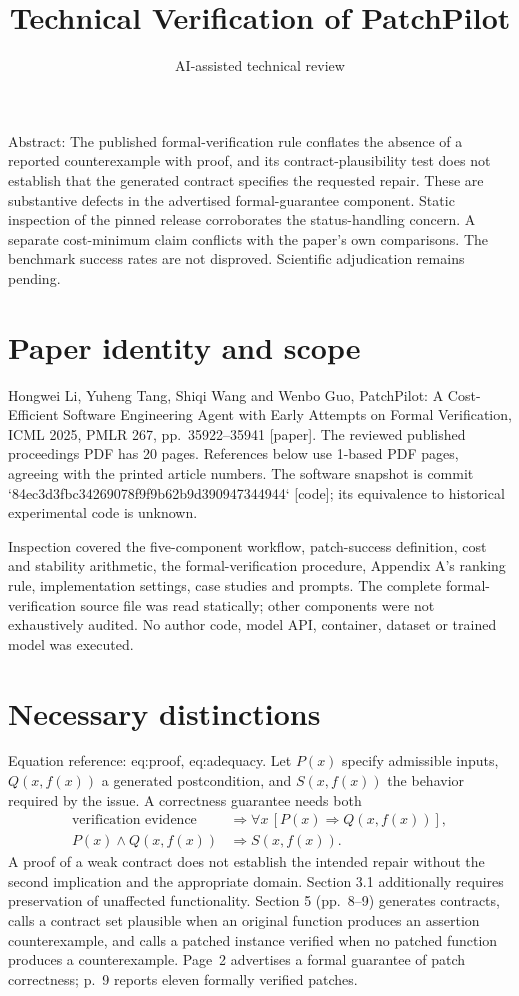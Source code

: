 \documentclass[10pt]{article}
\title{Technical Verification of PatchPilot}
\author{AI-assisted technical review}
\date{}
\begin{document}
\maketitle
Abstract: The published formal-verification rule conflates the absence of a reported counterexample with proof, and its contract-plausibility test does not establish that the generated contract specifies the requested repair. These are substantive defects in the advertised formal-guarantee component. Static inspection of the pinned release corroborates the status-handling concern. A separate cost-minimum claim conflicts with the paper’s own comparisons. The benchmark success rates are not disproved. Scientific adjudication remains pending.\par
\section*{Paper identity and scope}
Hongwei Li, Yuheng Tang, Shiqi Wang and Wenbo Guo, PatchPilot: A Cost-Efficient Software Engineering Agent with Early Attempts on Formal Verification, ICML 2025, PMLR 267, pp. 35922–35941 [paper]. The reviewed published proceedings PDF has 20 pages. References below use 1-based PDF pages, agreeing with the printed article numbers. The software snapshot is commit `84ec3d3fbc34269078f9f9b62b9d390947344944` [code]; its equivalence to historical experimental code is unknown.\par
Inspection covered the five-component workflow, patch-success definition, cost and stability arithmetic, the formal-verification procedure, Appendix A’s ranking rule, implementation settings, case studies and prompts. The complete formal-verification source file was read statically; other components were not exhaustively audited. No author code, model API, container, dataset or trained model was executed.\par
\section*{Necessary distinctions}
Equation reference: eq:proof, eq:adequacy. Let \(P(x)\) specify admissible inputs, \(Q(x,f(x))\) a generated postcondition, and \(S(x,f(x))\) the behavior required by the issue. A correctness guarantee needs both \[\begin{aligned}
\text{verification evidence}&\Longrightarrow
 \forall x\,[P(x)\Rightarrow Q(x,f(x))],\\
P(x)\wedge Q(x,f(x))&\Longrightarrow S(x,f(x)).
\end{aligned}\] A proof of a weak contract does not establish the intended repair without the second implication and the appropriate domain. Section 3.1 additionally requires preservation of unaffected functionality. Section 5 (pp. 8–9) generates contracts, calls a contract set plausible when an original function produces an assertion counterexample, and calls a patched instance verified when no patched function produces a counterexample. Page 2 advertises a formal guarantee of patch correctness; p. 9 reports eleven formally verified patches.\par
\end{document}
